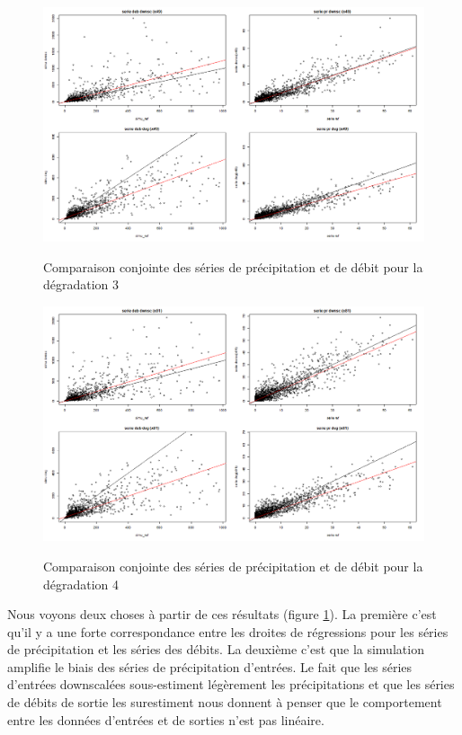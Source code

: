 \documentclass[a4paper,11pt]{article}
\numberwithin{equation}{section}
\begin{document}
\begin{figure}[H]
	\begin{center}
		\includegraphics[scale=0.35]{images/multi_comparaison_4.png}\\
	\end{center}
\caption{Comparaison conjointe des séries de précipitation et de débit pour la dégradation 3}
\end{figure} 
\begin{figure}[H]
	\begin{center}
		\includegraphics[scale=0.35]{images/multi_comparaison_5.png}\\
	\end{center}
\caption{Comparaison conjointe des séries de précipitation et de débit pour la dégradation 4}
\label{fig-comparaison}
\end{figure} 

Nous voyons deux choses à partir de ces résultats (figure \ref{fig-comparaison}). La première c'est qu'il y a une forte correspondance entre les droites de régressions pour les séries de précipitation et les séries des débits. La deuxième c'est que la simulation amplifie le biais des séries de précipitation d'entrées. Le fait que les séries d'entrées downscalées sous-estiment légèrement les précipitations et que les séries de débits de sortie les surestiment nous donnent à penser que le comportement entre les données d'entrées et de sorties n'est pas linéaire.
 
\end{document}
